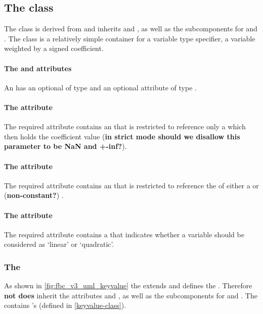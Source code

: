 \subsection{The \FBC {} class}
\label{userconstraintcomponent-class}

The \FBC \UserConstraintComponent class is derived from \SBML \SBase and inherits
 and , as well as the subcomponents for
\Annotation and \Notes. The \UserConstraintComponent class is a relatively simple container for a variable type specifier, a variable weighted by a signed coefficient.

\paragraph{The  and  attributes}
An \UserConstraintComponent has an optional  of type  and an optional attribute  of type .

\paragraph{The  attribute}
The required  attribute contains an  that is restricted to reference only a \Parameter which then holds the coefficient value (\textbf{\large in strict mode should we disallow this parameter to be NaN and +-inf?}).

\paragraph{The  attribute}
The required  attribute contains an  that is restricted to reference the  of either a \Reaction or (\textbf{\large non-constant?}) \Parameter.

\paragraph{The  attribute}
The required  attribute contains a  that indicates whether a variable should be considered as `linear' or `quadratic'.

\subsubsection{The \FBC {}}
\label{listofkeyvalues-class}
As shown in \ref{fig:fbc_v3_uml_keyvalue} the \ListOfKeyValues extends \SBase and defines the . Therefore \textbf{not does} inherit the
attributes  and , as well as the subcomponents for \Annotation and \Notes. The \ListOfKeyValues contains \KeyValue's (defined in \ref{keyvalue-class}).

